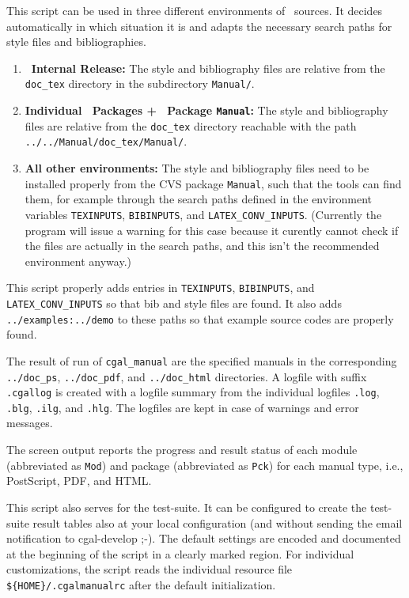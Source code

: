  This script can be used in three different environments of \cgal\ sources.
 It decides automatically in which situation it is and adapts the necessary
 search paths for style files and bibliographies.

\begin{enumerate} 
  \item \textbf{\cgal\ Internal Release:}
     The style and bibliography files are relative from the
     \texttt{doc\_tex} directory  in the subdirectory
     \texttt{Manual/}.
 
  \item \textbf{Individual \cgal\ Packages + \cgal\ Package \texttt{Manual}:}
     The style and bibliography files are  relative from the
     \texttt{doc\_tex} directory reachable with the path
     \texttt{../../Manual/doc\_tex/Manual/}.

   \item \textbf{All other environments:}
     The style and bibliography files need to be installed properly
     from the CVS package \texttt{Manual}, such that the tools can
     find them, for example through the search paths defined in the
     environment variables  \texttt{TEXINPUTS}, \texttt{BIBINPUTS},
     and \texttt{LATEX\_CONV\_INPUTS}. (Currently the program will
     issue a warning for this case because it curently cannot check if
     the files are actually in the search paths, and this isn't the
     recommended environment anyway.)
\end{enumerate}
 
This script properly adds entries in \texttt{TEXINPUTS},
\texttt{BIBINPUTS}, and \texttt{LATEX\_CONV\_INPUTS} so that bib and
style files are found. It also adds \texttt{../examples:../demo} to
these paths so that example source codes are properly found.

The result of run of \texttt{cgal\_manual} are the specified manuals
in the corresponding \texttt{../doc\_ps}, \texttt{../doc\_pdf}, and
\texttt{../doc\_html} directories. A logfile with suffix
\texttt{.cgallog} is created with a logfile summary from the
individual logfiles \texttt{.log}, \texttt{.blg}, \texttt{.ilg}, and
\texttt{.hlg}. The logfiles are kept in case of warnings and error
messages. 

The screen output reports the progress and result status of each
module (abbreviated as \texttt{Mod}) and package (abbreviated as
\texttt{Pck}) for each manual type, i.e., PostScript, PDF, and HTML.

This script also serves for the test-suite. It can be configured to
create the test-suite result tables also at your local configuration
(and without sending the email notification to cgal-develop ;-).
The default settings are encoded and documented at the beginning of
the script in a clearly marked region. For individual customizations,
the script reads the individual resource file
\verb|${HOME}/.cgalmanualrc| after the default initialization.

